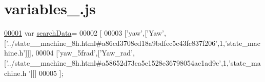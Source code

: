 \hypertarget{variables__18_8js_source}{}\section{variables\+\_.\+js}
\label{variables__18_8js_source}

\begin{DoxyCode}
\hypertarget{variables__18_8js_source.tex_l00001}{}\hyperlink{variables__18_8js_ad01a7523f103d6242ef9b0451861231e}{00001} var \hyperlink{variables__18_8js_ad01a7523f103d6242ef9b0451861231e}{searchData}=
00002 [
00003   [\textcolor{stringliteral}{'yaw'},[\textcolor{stringliteral}{'Yaw'},[\textcolor{stringliteral}{'../state\_\_machine\_8h.html#a86cd3708ed18a9bdfec5c43fc837f206'},1,\textcolor{stringliteral}{'state\_machine.h'}]]],
00004   [\textcolor{stringliteral}{'yaw\_5frad'},[\textcolor{stringliteral}{'Yaw\_rad'},[\textcolor{stringliteral}{'../state\_\_machine\_8h.html#a58652d73ca5e1528e36798054ac1ad9e'},1,\textcolor{stringliteral}{'state\_machine.h
      '}]]]
00005 ];
\end{DoxyCode}
